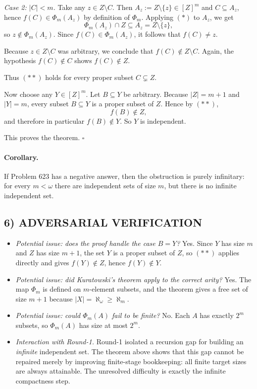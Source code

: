 \smallskip

\emph{Case 2: $|C|<m$.}
Take any $z\in Z\setminus C$.
Then $A_z:=Z\setminus\{z\}\in [Z]^m$ and $C\subseteq A_z$, hence
$f(C)\in \Phi_m(A_z)$ by definition of $\Phi_m$.
Applying $(*)$ to $A_z$, we get
\[
\Phi_m(A_z)\cap Z\subseteq A_z=Z\setminus\{z\},
\]
so $z\notin \Phi_m(A_z)$.
Since $f(C)\in \Phi_m(A_z)$, it follows that $f(C)\neq z$.

Because $z\in Z\setminus C$ was arbitrary, we conclude that
$f(C)\notin Z\setminus C$.
Again, the hypothesis $f(C)\notin C$ shows $f(C)\notin Z$.

\smallskip

Thus $(**)$ holds for every proper subset $C\subsetneq Z$.

Now choose any $Y\in [Z]^m$.
Let $B\subseteq Y$ be arbitrary.
Because $|Z|=m+1$ and $|Y|=m$, every subset $B\subseteq Y$ is a proper subset of $Z$.
Hence by $(**)$,
\[
f(B)\notin Z,
\]
and therefore in particular $f(B)\notin Y$.
So $Y$ is independent.

This proves the theorem. \hfill $\square$

\paragraph{Corollary.}
If Problem 623 has a negative answer, then the obstruction is purely infinitary:
for every $m<\omega$ there are independent sets of size $m$, but there is no infinite independent set.

\subsection*{6) ADVERSARIAL VERIFICATION}

\begin{itemize}
\item \emph{Potential issue: does the proof handle the case $B=Y$?}
Yes. Since $Y$ has size $m$ and $Z$ has size $m+1$, the set $Y$ is a proper subset of $Z$,
so $(**)$ applies directly and gives $f(Y)\notin Z$, hence $f(Y)\notin Y$.

\item \emph{Potential issue: did Kuratowski's theorem apply to the correct arity?}
Yes. The map $\Phi_m$ is defined on $m$-element subsets, and the theorem gives a free set of
size $m+1$ because $|X|=\aleph_\omega\ge \aleph_m$.

\item \emph{Potential issue: could $\Phi_m(A)$ fail to be finite?}
No. Each $A$ has exactly $2^m$ subsets, so $\Phi_m(A)$ has size at most $2^m$.

\item \emph{Interaction with Round-1.}
Round-1 isolated a recursion gap for building an \emph{infinite} independent set.
The theorem above shows that this gap cannot be repaired merely by improving finite-stage bookkeeping:
all finite target sizes are always attainable. The unresolved difficulty is exactly the infinite compactness step.
\end{itemize}

